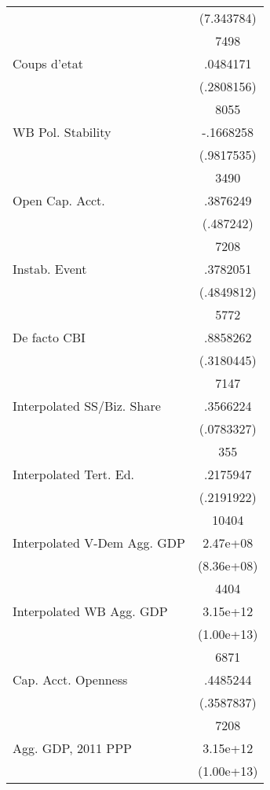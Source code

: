 {\begin{longtable}{l*{1}{c}}
                    &  (7.343784)\\
                    &        7498\\
Coups d'etat        &    .0484171\\
                    &  (.2808156)\\
                    &        8055\\
WB Pol. Stability   &   -.1668258\\
                    &  (.9817535)\\
                    &        3490\\
Open Cap. Acct.     &    .3876249\\
                    &   (.487242)\\
                    &        7208\\
Instab. Event       &    .3782051\\
                    &  (.4849812)\\
                    &        5772\\
De facto CBI        &    .8858262\\
                    &  (.3180445)\\
                    &        7147\\
Interpolated SS/Biz. Share&    .3566224\\
                    &  (.0783327)\\
                    &         355\\
Interpolated Tert. Ed.&    .2175947\\
                    &  (.2191922)\\
                    &       10404\\
Interpolated V-Dem Agg. GDP&    2.47e+08\\
                    &  (8.36e+08)\\
                    &        4404\\
Interpolated WB Agg. GDP&    3.15e+12\\
                    &  (1.00e+13)\\
                    &        6871\\
Cap. Acct. Openness &    .4485244\\
                    &  (.3587837)\\
                    &        7208\\
Agg. GDP, 2011 PPP  &    3.15e+12\\
                    &  (1.00e+13)\\

\end{longtable}}
